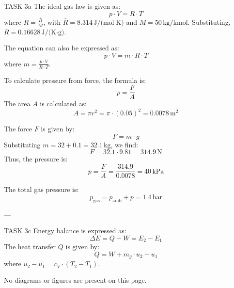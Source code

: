 TASK 3a  
The ideal gas law is given as:  
\[
p \cdot V = R \cdot T
\]  
where \( R = \frac{\bar{R}}{M} \), with \( \bar{R} = 8.314 \, \text{J/(mol·K)} \) and \( M = 50 \, \text{kg/kmol} \). Substituting, \( R = 0.16628 \, \text{J/(K·g)} \).  

The equation can also be expressed as:  
\[
p \cdot V = m \cdot R \cdot T
\]  
where \( m = \frac{p \cdot V}{R \cdot T} \).  

To calculate pressure from force, the formula is:  
\[
p = \frac{F}{A}
\]  
The area \( A \) is calculated as:  
\[
A = \pi r^2 = \pi \cdot (0.05)^2 = 0.0078 \, \text{m}^2
\]  

The force \( F \) is given by:  
\[
F = m \cdot g
\]  
Substituting \( m = 32 + 0.1 = 32.1 \, \text{kg} \), we find:  
\[
F = 32.1 \cdot 9.81 = 314.9 \, \text{N}
\]  
Thus, the pressure is:  
\[
p = \frac{F}{A} = \frac{314.9}{0.0078} = 40 \, \text{kPa}
\]  

The total gas pressure is:  
\[
p_{\text{gas}} = p_{\text{amb}} + p = 1.4 \, \text{bar}
\]  

---

TASK 3c  
Energy balance is expressed as:  
\[
\Delta E = Q - W = E_2 - E_1
\]  
The heat transfer \( Q \) is given by:  
\[
Q = W + m_g \cdot u_2 - u_1
\]  
where \( u_2 - u_1 = c_V \cdot (T_2 - T_1) \).  

No diagrams or figures are present on this page.